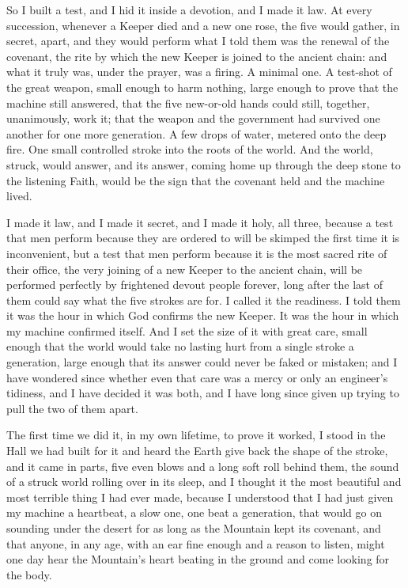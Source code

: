 So I built a test, and I hid it inside a devotion, and I made it law. At every succession, whenever a Keeper died and a new one rose, the five would gather, in secret, apart, and they would perform what I told them was the renewal of the covenant, the rite by which the new Keeper is joined to the ancient chain: and what it truly was, under the prayer, was a firing. A minimal one. A test-shot of the great weapon, small enough to harm nothing, large enough to prove that the machine still answered, that the five new-or-old hands could still, together, unanimously, work it; that the weapon and the government had survived one another for one more generation. A few drops of water, metered onto the deep fire. One small controlled stroke into the roots of the world. And the world, struck, would answer, and its answer, coming home up through the deep stone to the listening Faith, would be the sign that the covenant held and the machine lived.\par

I made it law, and I made it secret, and I made it holy, all three, because a test that men perform because they are ordered to will be skimped the first time it is inconvenient, but a test that men perform because it is the most sacred rite of their office, the very joining of a new Keeper to the ancient chain, will be performed perfectly by frightened devout people forever, long after the last of them could say what the five strokes are for. I called it the readiness. I told them it was the hour in which God confirms the new Keeper. It was the hour in which my machine confirmed itself. And I set the size of it with great care, small enough that the world would take no lasting hurt from a single stroke a generation, large enough that its answer could never be faked or mistaken; and I have wondered since whether even that care was a mercy or only an engineer's tidiness, and I have decided it was both, and I have long since given up trying to pull the two of them apart.\par

The first time we did it, in my own lifetime, to prove it worked, I stood in the Hall we had built for it and heard the Earth give back the shape of the stroke, and it came in parts, five even blows and a long soft roll behind them, the sound of a struck world rolling over in its sleep, and I thought it the most beautiful and most terrible thing I had ever made, because I understood that I had just given my machine a heartbeat, a slow one, one beat a generation, that would go on sounding under the desert for as long as the Mountain kept its covenant, and that anyone, in any age, with an ear fine enough and a reason to listen, might one day hear the Mountain's heart beating in the ground and come looking for the body.\par


